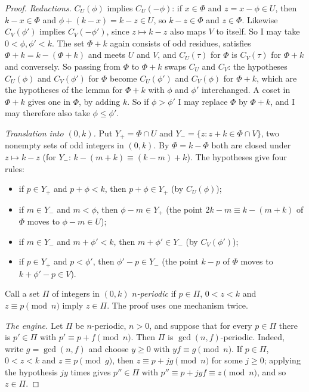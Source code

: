 \begin{proof}
\emph{Reductions.} $C_U(\phi)$ implies $C_U(-\phi)$: if $x\in \Phi$ and
$z=x-\phi\in U$, then $k-x\in \Phi$ and $\phi+(k-x)=k-z\in U$, so $k-z\in \Phi$ and
$z\in \Phi$. Likewise $C_V(\phi')$ implies $C_V(-\phi')$, since $z\mapsto k-z$
also maps $V$ to itself. So I may take $0<\phi,\phi'<k$. The set $\Phi+k$ again
consists of odd residues, satisfies $\Phi+k=k-(\Phi+k)$ and meets $U$ and $V$, and
$C_U(\tau)$ for $\Phi$ is $C_V(\tau)$ for $\Phi+k$ and conversely. So passing
from $\Phi$ to $\Phi+k$ swaps $C_U$ and $C_V$: the hypotheses $C_U(\phi)$ and
$C_V(\phi')$ for $\Phi$ become $C_U(\phi')$ and $C_V(\phi)$ for $\Phi+k$, which
are the hypotheses of the lemma for $\Phi+k$ with $\phi$ and $\phi'$
interchanged. A coset in $\Phi+k$ gives one in $\Phi$, by adding $k$. So if
$\phi>\phi'$ I may replace $\Phi$ by $\Phi+k$, and I may therefore also take
$\phi\le\phi'$.

\emph{Translation into $(0,k)$.} Put $Y_+=\Phi\cap U$ and $Y_-=\{z:z+k\in \Phi\cap
V\}$, two nonempty sets of odd integers in $(0,k)$. By $\Phi=k-\Phi$ both are
closed under $z\mapsto k-z$ (for $Y_-$: $k-(m+k)\equiv(k-m)+k$). The
hypotheses give four rules:
\begin{itemize}
\item[(G1)] if $p\in Y_+$ and $p+\phi<k$, then $p+\phi\in Y_+$ (by $C_U(\phi)$);
\item[(G2)] if $m\in Y_-$ and $m<\phi$, then $\phi-m\in Y_+$ (the point
$2k-m\equiv k-(m+k)$ of $\Phi$ moves to $\phi-m\in U$);
\item[(G3)] if $m\in Y_-$ and $m+\phi'<k$, then $m+\phi'\in Y_-$ (by $C_V(\phi')$);
\item[(G4)] if $p\in Y_+$ and $p<\phi'$, then $\phi'-p\in Y_-$ (the point $k-p$ of
$\Phi$ moves to $k+\phi'-p\in V$).
\end{itemize}
Call a set $\Pi$ of integers in $(0,k)$ \emph{$n$-periodic} if $p\in\Pi$,
$0<z<k$ and $z\equiv p\pmod n$ imply $z\in\Pi$. The proof uses one
mechanism twice.

\emph{The engine.} Let $\Pi$ be $n$-periodic, $n>0$, and suppose that for
every $p\in\Pi$ there is $p'\in\Pi$ with $p'\equiv p+f\pmod n$. Then $\Pi$ is
$\gcd(n,f)$-periodic. Indeed, write $g=\gcd(n,f)$ and choose $y\ge0$ with
$yf\equiv g\pmod n$. If $p\in\Pi$, $0<z<k$ and $z\equiv p\pmod g$, then
$z\equiv p+jg\pmod n$ for some $j\ge0$; applying the hypothesis $jy$ times
gives $p''\in\Pi$ with $p''\equiv p+jyf\equiv z\pmod n$, and so $z\in\Pi$.


\end{proof}
